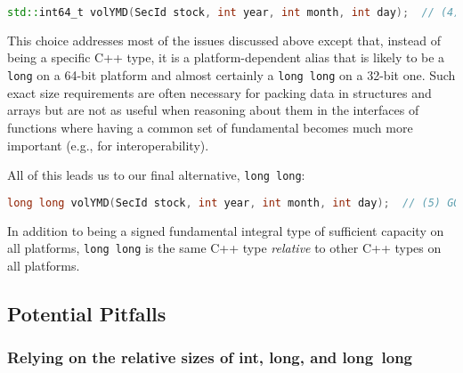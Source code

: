 \begin{lstlisting}[language=C++]
std::int64_t volYMD(SecId stock, int year, int month, int day);  // (4) OK
\end{lstlisting}

\noindent This choice addresses most of the issues discussed above except that,
instead of being a specific C++ type, it is a platform-dependent alias
that is likely to be a \lstinline!long! on a 64-bit platform and almost
certainly a \lstinline!long!~\lstinline!long! on a 32-bit one. Such exact size
requirements are often necessary for packing data in structures and
arrays but are not as useful when reasoning about them in the
interfaces of functions where having a common set of fundamental
 becomes much more important (e.g., for
interoperability).

All of this leads us to our final alternative, \lstinline!long!~\lstinline!long!:

\begin{lstlisting}[language=C++]
long long volYMD(SecId stock, int year, int month, int day);  // (5) GOOD IDEA
\end{lstlisting}

\noindent In addition to being a signed fundamental integral type of sufficient
capacity on all platforms, \lstinline!long!~\lstinline!long! is the same C++
type \emph{relative} to other C++ types on all platforms.

\subsection[Potential Pitfalls]{Potential Pitfalls}\label{longlong-potential-pitfalls}

\subsubsection[Relying on the relative sizes of \lstinline!int!, \lstinline!long!, and \lstinline!long!~\lstinline!long!]{Relying on the relative sizes of {\SubsubsecCode int}, {\SubsubsecCode long}, and {\SubsubsecCode long}~{\SubsubsecCode long}}\label{relying-on-the-relative-sizes-of-int,-long,-and-long-long}

